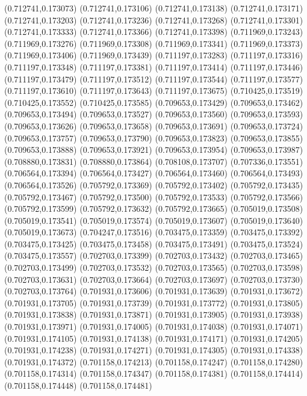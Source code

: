 (0.712741,0.173073)
(0.712741,0.173106)
(0.712741,0.173138)
(0.712741,0.173171)
(0.712741,0.173203)
(0.712741,0.173236)
(0.712741,0.173268)
(0.712741,0.173301)
(0.712741,0.173333)
(0.712741,0.173366)
(0.712741,0.173398)
(0.711969,0.173243)
(0.711969,0.173276)
(0.711969,0.173308)
(0.711969,0.173341)
(0.711969,0.173373)
(0.711969,0.173406)
(0.711969,0.173439)
(0.711197,0.173283)
(0.711197,0.173316)
(0.711197,0.173348)
(0.711197,0.173381)
(0.711197,0.173414)
(0.711197,0.173446)
(0.711197,0.173479)
(0.711197,0.173512)
(0.711197,0.173544)
(0.711197,0.173577)
(0.711197,0.173610)
(0.711197,0.173643)
(0.711197,0.173675)
(0.710425,0.173519)
(0.710425,0.173552)
(0.710425,0.173585)
(0.709653,0.173429)
(0.709653,0.173462)
(0.709653,0.173494)
(0.709653,0.173527)
(0.709653,0.173560)
(0.709653,0.173593)
(0.709653,0.173626)
(0.709653,0.173658)
(0.709653,0.173691)
(0.709653,0.173724)
(0.709653,0.173757)
(0.709653,0.173790)
(0.709653,0.173823)
(0.709653,0.173855)
(0.709653,0.173888)
(0.709653,0.173921)
(0.709653,0.173954)
(0.709653,0.173987)
(0.708880,0.173831)
(0.708880,0.173864)
(0.708108,0.173707)
(0.707336,0.173551)
(0.706564,0.173394)
(0.706564,0.173427)
(0.706564,0.173460)
(0.706564,0.173493)
(0.706564,0.173526)
(0.705792,0.173369)
(0.705792,0.173402)
(0.705792,0.173435)
(0.705792,0.173467)
(0.705792,0.173500)
(0.705792,0.173533)
(0.705792,0.173566)
(0.705792,0.173599)
(0.705792,0.173632)
(0.705792,0.173665)
(0.705019,0.173508)
(0.705019,0.173541)
(0.705019,0.173574)
(0.705019,0.173607)
(0.705019,0.173640)
(0.705019,0.173673)
(0.704247,0.173516)
(0.703475,0.173359)
(0.703475,0.173392)
(0.703475,0.173425)
(0.703475,0.173458)
(0.703475,0.173491)
(0.703475,0.173524)
(0.703475,0.173557)
(0.702703,0.173399)
(0.702703,0.173432)
(0.702703,0.173465)
(0.702703,0.173499)
(0.702703,0.173532)
(0.702703,0.173565)
(0.702703,0.173598)
(0.702703,0.173631)
(0.702703,0.173664)
(0.702703,0.173697)
(0.702703,0.173730)
(0.702703,0.173764)
(0.701931,0.173606)
(0.701931,0.173639)
(0.701931,0.173672)
(0.701931,0.173705)
(0.701931,0.173739)
(0.701931,0.173772)
(0.701931,0.173805)
(0.701931,0.173838)
(0.701931,0.173871)
(0.701931,0.173905)
(0.701931,0.173938)
(0.701931,0.173971)
(0.701931,0.174005)
(0.701931,0.174038)
(0.701931,0.174071)
(0.701931,0.174105)
(0.701931,0.174138)
(0.701931,0.174171)
(0.701931,0.174205)
(0.701931,0.174238)
(0.701931,0.174271)
(0.701931,0.174305)
(0.701931,0.174338)
(0.701931,0.174372)
(0.701158,0.174213)
(0.701158,0.174247)
(0.701158,0.174280)
(0.701158,0.174314)
(0.701158,0.174347)
(0.701158,0.174381)
(0.701158,0.174414)
(0.701158,0.174448)
(0.701158,0.174481)
